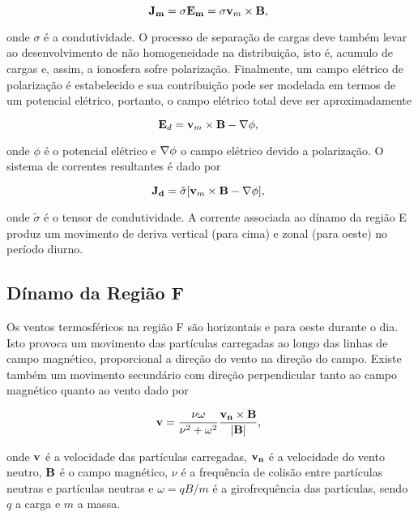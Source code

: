 \begin{equation}
{\bf J_m}=\sigma{\bf E_m} = \sigma{\bf v}_m\times{\bf B}\mbox{,}~
\end{equation}

onde $\sigma$ é a condutividade. O processo de separação de cargas deve também levar ao desenvolvimento de não homogeneidade na distribuição, isto é, acumulo de cargas e, assim, a ionosfera sofre polarização. Finalmente, um campo elétrico de polarização é estabelecido e sua contribuição pode ser modelada em termos de um potencial elétrico, portanto, o campo elétrico total deve ser aproximadamente

\begin{equation}
{\bf E}_d = {\bf v}_m\times{\bf B}-{\bf \nabla}\phi\mbox{,}~
\end{equation}

onde $\phi$ é o potencial elétrico e ${\bf \nabla}\phi$ o campo elétrico devido a polarização. O sistema de correntes resultantes é dado por

\begin{equation}
{\bf J_d}=\tilde{\sigma}[{\bf v}_m\times{\bf B}-{\bf \nabla}\phi]\mbox{,}~
\end{equation}

onde $\tilde{\sigma}$ é o tensor de condutividade. A corrente associada ao dínamo da região E produz um movimento de deriva vertical (para cima) e zonal (para oeste) no período diurno.

\subsection{Dínamo da Região F}

Os ventos termosféricos na região F são horizontais e para oeste durante o dia. Isto provoca um movimento das partículas carregadas ao longo das linhas de campo magnético, proporcional a direção do vento na direção do campo. Existe também um movimento secundário com direção perpendicular tanto ao campo magnético quanto ao vento \cite{BATISTA:1986} dado por

\begin{equation}
{\bf v}=\frac{\nu\omega}{\nu^2+\omega^2}\frac{{\bf v_n}\times{\bf B}}{|{\bf B}|}\mbox{,}~
\end{equation}

onde ${\bf v}$ é a velocidade das partículas carregadas, ${\bf v_n}$ é a velocidade do vento neutro, ${\bf B}$ é o campo magnético, $\nu$ é a frequência de colisão entre partículas neutras e partículas neutras e $\omega={qB/m}$ é a girofrequência das partículas, sendo $q$ a carga e $m$ a massa.

